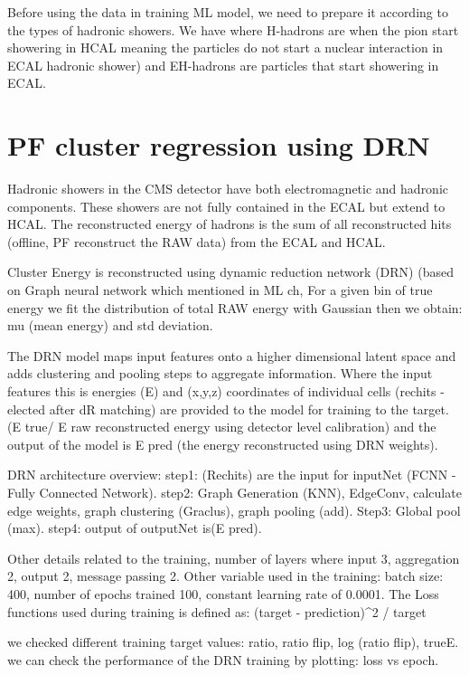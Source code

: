 Before using the data in training ML model, we need to prepare it according to the types of hadronic showers.
We have where H-hadrons are when the pion start showering in HCAL meaning the particles do not start a nuclear interaction in ECAL hadronic shower) and EH-hadrons are particles that start showering in ECAL. 


\section{PF cluster regression using DRN}

Hadronic showers in the CMS detector have both electromagnetic and hadronic components. These showers are not fully contained in the ECAL but extend to HCAL. The reconstructed energy of hadrons is the sum of all reconstructed hits (offline, PF reconstruct the RAW data) from the ECAL and HCAL. 


Cluster Energy is reconstructed using dynamic reduction network (DRN) (based on Graph neural network which mentioned in ML ch, %
For a given bin of true energy we fit the distribution of total RAW energy with Gaussian then we obtain: mu (mean energy) and std deviation.

The DRN model maps input features onto a higher dimensional latent space and adds clustering and pooling steps to aggregate information. Where the input features this is energies (E) and (x,y,z) coordinates of individual cells (rechits - elected after dR matching) are provided to the model for training to the target. (E true/ E raw reconstructed energy using detector level calibration) and the output of the model is E pred (the energy reconstructed using DRN weights).

DRN architecture overview:  
step1: (Rechits) are the input for inputNet (FCNN - Fully Connected Network). 
step2: Graph Generation (KNN), EdgeConv, calculate edge weights, graph clustering (Graclus), graph pooling (add). 
Step3: Global pool (max).  
step4: output of outputNet is(E pred).

Other details related to the training, number of layers where input 3, aggregation 2, output 2, message passing 2. Other variable used in the training: batch size: 400, number of epochs trained 100, constant learning rate of 0.0001. The Loss functions used during training is defined as: (target - prediction)^2 / target

we checked different training target values: ratio, ratio flip, log (ratio flip), trueE.  
we can check the performance of the DRN training by plotting: loss vs epoch.

